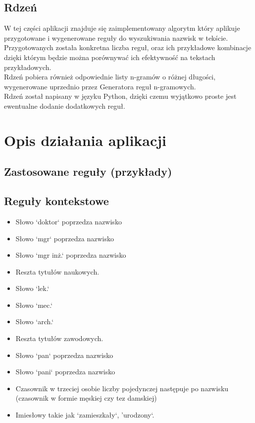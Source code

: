 \documentclass[12pt]{article}
\begin{document}
\subsection{Rdzeń}
W tej części aplikacji znajduje się zaimplementowany algorytm który aplikuje przygotowane i wygenerowane reguły do wyszukiwania nazwisk w tekście.
\\Przygotowanych została konkretna liczba reguł, oraz ich przykładowe kombinacje dzięki którym będzie można porównywać ich efektywność na tekstach przykładowych.
\\Rdzeń pobiera również odpowiednie listy n-gramów o różnej długości, wygenerowane uprzednio przez Generatora reguł n-gramowych.
\\Rdzeń został napisany w języku Python, dzięki czemu wyjątkowo proste jest ewentualne dodanie dodatkowych reguł.

\section{Opis działania aplikacji}

\subsection{Zastosowane reguły (przykłady)}

\subsection {Reguły kontekstowe}
\begin{itemize}
\item Słowo `doktor` poprzedza nazwisko
\item Słowo `mgr` poprzedza nazwisko
\item Słowo `mgr inż.` poprzedza nazwisko
\item Reszta tytułów naukowych.
\item Słowo `lek.`
\item Słowo `mec.`
\item Słowo `arch.`
\item Reszta tytułów zawodowych.
\item Słowo `pan` poprzedza nazwisko
\item Słowo `pani` poprzedza nazwisko
\item Czasownik w trzeciej osobie liczby pojedynczej następuje po nazwisku (czasownik w formie męskiej czy tez damskiej)
\item Imiesłowy takie jak `zamieszkały`, 'urodzony`.
\end{itemize}
\end{document}
